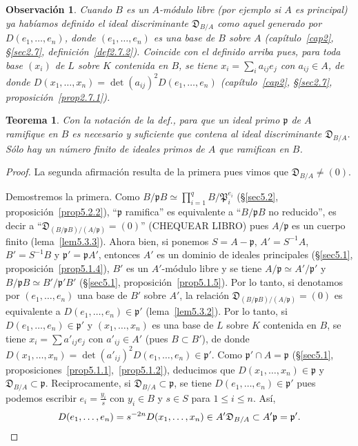 \documentclass[10pt,oneside,bibtotoc,smallheadings,leqno,a5paper,DIV=12]{scrbook}
\newcommand{\idl}[1]{\mathfrak{#1}}
\newcommand{\disc}{\mathfrak{D}}
\numberwithin{equation}{section}
\theoremstyle{defi}
\theoremstyle{enonce}
\newtheorem{theorem}{Teorema}
\theoremstyle{rem}
\newtheorem{remark}{Observaci\'on}
\numberwithin{theorem}{section}
\numberwithin{proposition}{section}
\numberwithin{definition}{section}
\numberwithin{lemma}{section}
\numberwithin{corollary}{section}
\numberwithin{example}{section}
\numberwithin{footnote}{section}%
\begin{document}
\begin{remark}
Cuando $B$ es un $A$-m\'odulo {\em libre} (por ejemplo si $A$ es principal)
ya hab\'iamos definido el ideal discriminante $\disc_{B/A}$ como aquel generado por $D(e_{1},\dots,e_{n})$,
donde $(e_{1},\dots,e_{n})$ es una base de $B$ sobre $A$ (cap\'itulo~\ref{cap2}, \S\ref{sec2.7}, definici\'on~\ref{def2.7.2}). Coincide
con el definido arriba pues, para toda base $(x_{i})$ de $L$ sobre $K$ contenida en $B$, se tiene
$x_{i} = \sum_{i}a_{ij}e_{j}$ con $a_{ij}\in A$, de donde
$D(x_{1},\dots,x_{n}) = \det(a_{ij})^{2}D(e_{1},\dots,e_{n})$
(cap\'itulo~\ref{cap2}, \S\ref{sec2.7}, proposici\'on~\ref{prop2.7.1}).
\end{remark}

\begin{theorem}\label{teo5.3.1}
Con la notaci\'on de la def., para que un ideal primo $\idl{p}$ de $A$ ramifique en $B$ es necesario y
suficiente que contena al ideal discriminante $\disc_{B/A}$. S\'olo hay un n\'umero finito de
ideales primos de $A$ que ramifican en $B$.
\end{theorem}

\begin{proof}
La segunda afirmaci\'on resulta de la primera pues vimos que $\disc_{B/A}\neq(0)$.

Demostremos la primera. Como $B/\idl{p}B\simeq\prod_{i=1}^{q}B/\idl{P}_{i}^{e_{i}}$ (\S\ref{sec5.2}, proposici\'on~\ref{prop5.2.2}),
``$\idl{p}$ ramifica'' es equivalente a ``$B/\idl{p}B$ no reducido'', es decir a
``$\disc_{(B/\idl{p}B)/(A/\idl{p})}=(0)$'' (CHEQUEAR LIBRO) pues $A/\idl{p}$ es un cuerpo finito (lema~\ref{lem5.3.3}). Ahora bien,
si ponemos $S = A-\idl{p}$, $A' = S^{-1}A$, $B' =S^{-1}B$ y $\idl{p}' = \idl{p}A'$, entonces
$A'$ es un dominio de ideales principales (\S\ref{sec5.1}, proposici\'on~\ref{prop5.1.4}),
$B'$ es un $A'$-m\'odulo libre y se
tiene $A/\idl{p}\simeq A'/\idl{p}'$ y $B/\idl{p}B\simeq B'/\idl{p}'B'$
(\S\ref{sec5.1}, proposici\'on~\ref{prop5.1.5}). Por lo tanto, si denotamos por $(e_{1},\dots,e_{n})$ una base de $B'$ sobre $A'$, la
relaci\'on $\disc_{(B/\idl{p}B)/(A/\idl{p})}=(0)$ es equivalente a $D(e_{1},\dots,e_{n})\in\idl{p}'$
(lema~\ref{lem5.3.2}). Por lo tanto, si $D(e_{1},\dots,e_{n})\in\idl{p}'$ y $(x_{1},\dots,x_{n})$ es una base de $L$
sobre $K$ contenida en $B$, se tiene $x_{i} = \sum a'_{ij}e_{j}$ con $a'_{ij}\in A'$
(pues $B\subset B'$), de donde $D(x_{1},\dots,x_{n})=\det(a'_{ij})^{2}D(e_{1},\dots,e_{n})\in\idl{p}'$.
Como $\idl{p}'\cap A = \idl{p}$ (\S\ref{sec5.1}, proposiciones~\ref{prop5.1.1},~\ref{prop5.1.2}),
deducimos que $D(x_{1},\dots,x_{n})\in\idl{p}$ y
$\disc_{B/A}\subset\idl{p}$. Reciprocamente, si $\disc_{B/A}\subset\idl{p}$, se tiene
$D(e_{1},\dots,e_{n})\in\idl{p}'$ pues podemos escribir $e_{i}=\frac{y_{i}}{s}$ con $y_{i}\in B$
y $s\in S$ para $1\leq i\leq n$. As\'i,
\begin{gather*}
D(e_{1},\dots,e_{n}) = s^{-2n}D(x_{1},\dots,x_{n})\in A'\disc_{B/A}\subset A'\idl{p}=\idl{p}'.\qedhere
\end{gather*}
\end{proof}
\end{document}
